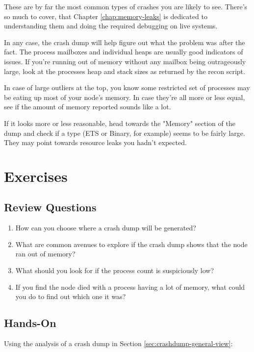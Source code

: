 \documentclass[11pt, oneside]{book}   	%
\begin{document}
These are by far the most common types of crashes you are likely to see. There's so much to cover, that Chapter \ref{chap:memory-leaks} is dedicated to understanding them and doing the required debugging on live systems.

In any case, the crash dump will help figure out what the problem was after the fact. The process mailboxes and individual heaps are usually good indicators of issues. If you're running out of memory without any mailbox being outrageously large, look at the processes heap and stack sizes as returned by the recon script.

In case of large outliers at the top, you know some restricted set of processes may be eating up most of your node's memory. In case they're all more or less equal, see if the amount of memory reported sounds like a lot.

If it looks more or less reasonable, head towards the "Memory" section of the dump and check if a type (ETS or Binary, for example) seems to be fairly large. They may point towards resource leaks you hadn't expected.


\section{Exercises}

\subsection*{Review Questions}

\begin{enumerate}
	\item How can you choose where a crash dump will be generated?
	\item What are common avenues to explore if the crash dump shows that the node ran out of memory?
	\item What should you look for if the process count is suspiciously low?
	\item If you find the node died with a process having a lot of memory, what could you do to find out which one it was?\end{enumerate}

\subsection*{Hands-On}

Using the analysis of a crash dump in Section \ref{sec:crashdump-general-view}:
\end{document}
